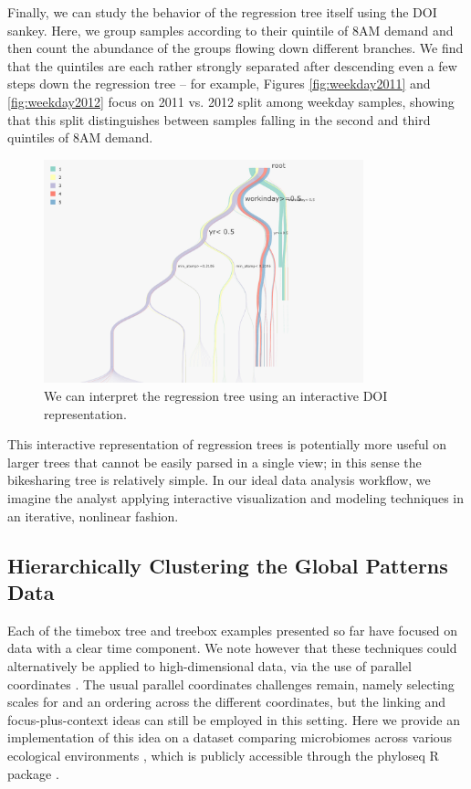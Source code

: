\documentclass[12pt]{article}
\begin{document}
Finally, we can study the behavior of the regression tree itself using
the DOI sankey. Here, we group samples according to their quintile of
8AM demand and then count the abundance of the groups flowing down
different branches. We find that the quintiles are each rather strongly
separated after descending even a few steps down the regression tree --
for example, Figures \ref{fig:weekday2011} and \ref{fig:weekday2012}
focus on 2011 vs. 2012 split among weekday samples, showing that this
split distinguishes between samples falling in the second and third
quintiles of 8AM demand.

\begin{figure}

{\centering \includegraphics[width=350px]{figure/bike_sankey}

}

\caption{We can interpret the regression tree using an interactive DOI representation.}\label{fig:bikesankey}
\end{figure}

This interactive representation of regression trees is potentially more
useful on larger trees that cannot be easily parsed in a single view; in
this sense the bikesharing tree is relatively simple. In our ideal data
analysis workflow, we imagine the analyst applying interactive
visualization and modeling techniques in an iterative, nonlinear
fashion.

\subsection{Hierarchically Clustering the Global Patterns Data}\label{global_patterns}

Each of the timebox tree and treebox examples presented so far have
focused on data with a clear time component. We note however that these
techniques could alternatively be applied to high-dimensional data, via
the use of parallel coordinates \citep{inselberg1991parallel}. The usual
parallel coordinates challenges remain, namely selecting scales for and an
ordering across the different coordinates, but the linking and
focus-plus-context ideas can still be employed in this setting. Here we
provide an implementation of this idea on a dataset comparing microbiomes across
various ecological environments \citep{caporaso2011global}, which is publicly
accessible through the phyloseq R package \citep{mcmurdie2013phyloseq}.
\end{document}
